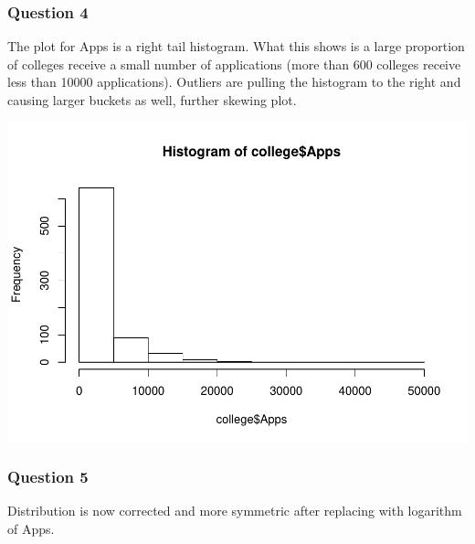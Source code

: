 \documentclass[]{article}
\newenvironment{Shaded}{\begin{snugshade}}{\end{snugshade}}
\newcommand{\FunctionTok}[1]{\textcolor[rgb]{0.00,0.00,0.00}{#1}}
\newcommand{\NormalTok}[1]{#1}
\newcommand{\OtherTok}[1]{\textcolor[rgb]{0.56,0.35,0.01}{#1}}
\newcommand{\SpecialCharTok}[1]{\textcolor[rgb]{0.00,0.00,0.00}{#1}}
\begin{document}
\hypertarget{question-4}{%
\subsubsection{Question 4}\label{question-4}}

The plot for Apps is a right tail histogram. What this shows is a large
proportion of colleges receive a small number of applications (more than
600 colleges receive less than 10000 applications). Outliers are pulling
the histogram to the right and causing larger buckets as well, further
skewing plot.

\begin{Shaded}
\end{Shaded}

\includegraphics{assignment3_files/figure-latex/unnamed-chunk-5-1.pdf}

\hypertarget{question-5}{%
\subsubsection{Question 5}\label{question-5}}

Distribution is now corrected and more symmetric after replacing with
logarithm of Apps.

\begin{Shaded}
\end{Shaded}
\end{document}
